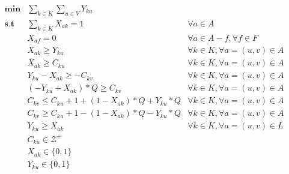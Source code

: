 \begin{align*}
    \mathbf{min} &\sum_{k\in K} \sum_{u \in V} {Y_{ku}} \\
   \mathbf{s.t}  &\sum_{k \in K}{X_{ak}=1} & \forall a \in A\\
        &X_{af} = 0 & \forall a \in A - f,  \forall f \in F\\
        &X_{ak} \geq Y_{ku} & \forall k \in K, \forall a = (u,v) \in A \\
        &X_{ak} \geq C_{ku} & \forall k \in K, \forall a = (u,v) \in A \\
        &Y_{ku} - X_{ak} \geq -C_{kv} & \forall k \in K, \forall a = (u,v) \in A \\
        &(-Y_{ku} + X_{ak}) * Q \geq C_{kv} & \forall k \in K, \forall a = (u,v) \in A \\
        &C_{kv} \leq C_{ku} + 1 + (1 - X_{ak}) * Q + Y_{ku} * Q & \forall k \in K, \forall a = (u,v) \in A \\
        &C_{kv} \geq C_{ku} + 1 - (1 - X_{ak}) * Q - Y_{ku} * Q & \forall k \in K, \forall a = (u,v) \in A \\
        &Y_{ku} \geq X_{ak} & \forall k \in K, \forall a = (u,v) \in L \\
        &C_{ku} \in \mathcal{Z^+} \\
        &X_{ak} \in \{0,1\} \\
        &Y_{ku} \in \{0,1\}
\end{align*}